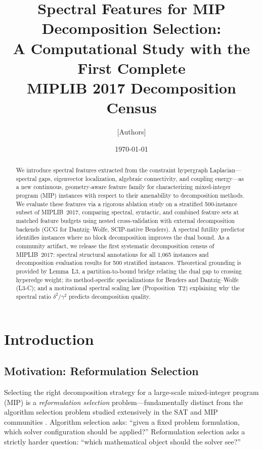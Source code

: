 \documentclass[12pt]{article}
\title{Spectral Features for MIP Decomposition Selection:\\
A Computational Study with the First Complete\\
MIPLIB 2017 Decomposition Census}
\author{[Authors]}
\date{\today}
\begin{document}
\maketitle

\begin{abstract}
We introduce spectral features extracted from the constraint hypergraph
Laplacian---spectral gaps, eigenvector localization, algebraic connectivity,
and coupling energy---as a new continuous, geometry-aware feature family for
characterizing mixed-integer program (MIP) instances with respect to their
amenability to decomposition methods.  We evaluate these features via a
rigorous ablation study on a stratified 500-instance subset of MIPLIB~2017,
comparing spectral, syntactic, and combined feature sets at matched feature
budgets using nested cross-validation with external decomposition backends
(GCG for Dantzig--Wolfe, SCIP-native Benders).  A spectral futility
predictor identifies instances where no block decomposition improves the
dual bound.  As a community artifact, we release the first systematic
decomposition census of MIPLIB~2017: spectral structural annotations for
all 1,065 instances and decomposition evaluation results for 500 stratified
instances.  Theoretical grounding is provided by Lemma~L3, a
partition-to-bound bridge relating the dual gap to crossing hyperedge weight;
its method-specific specializations for Benders and Dantzig--Wolfe (L3-C);
and a motivational spectral scaling law (Proposition~T2) explaining why the
spectral ratio $\delta^2/\gamma^2$ predicts decomposition quality.
\end{abstract}

\section{Introduction}
\label{sec:intro}

\subsection{Motivation: Reformulation Selection}

Selecting the right decomposition strategy for a large-scale mixed-integer
program (MIP) is a \emph{reformulation selection} problem---fundamentally
distinct from the algorithm selection problem studied extensively in the
SAT and MIP communities \citep{xu2008satzilla,lindauer2015autofolio}.
Algorithm selection asks: ``given a fixed problem formulation, which solver
configuration should be applied?''  Reformulation selection asks a strictly
harder question: ``which mathematical object should the solver see?''
\end{document}
